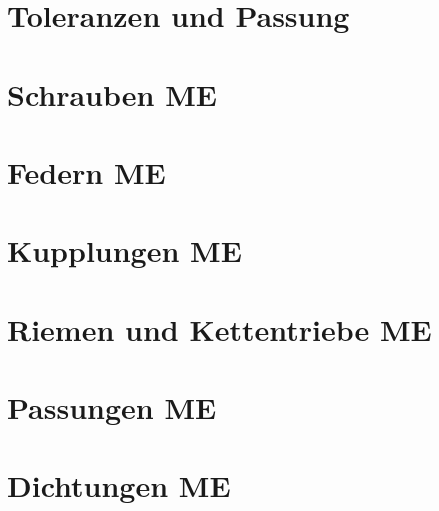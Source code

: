 \documentclass[numerate]{cheatsheet}
\begin{document}
\section{Toleranzen und Passung}
    
    

\section{Schrauben \hfill ME}
    
    
    
    
    
    
    
    
    
    
    
    

\section{Federn \hfill ME}
    
    
    
    
    
    
    

\section{Kupplungen \hfill ME}
    
    

\section{Riemen und Kettentriebe \hfill ME}
    

\section{Passungen \hfill ME}
    

\section{Dichtungen \hfill ME}
    
\end{document}
